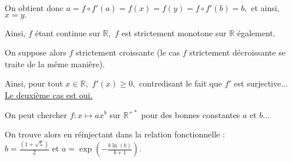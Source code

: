 On obtient donc $a=f\circ f'(a)=f(x)=f(y)=f\circ f'(b)=b,$ et ainsi, $x=y.$ 

Ainsi, $f$ étant continue sur $\mathbb{R},$ $f$ est strictement monotone sur $\mathbb{R}$ également.

On suppose alors $f$ strictement croissante (le cas $f$ strictement décroissante se traite de la même manière).

Ainsi, pour tout $x\in\mathbb{R},$ $\displaystyle f'(x)\geq 0,$ contredisant le fait que $f'$ est surjective...\\

\underline{ Le deuxième cas est oui.}

On peut chercher $f :x \mapsto ax^{b}$ sur $\mathbb{R}^{+*}$ pour des bonnes constantes $a$ et $b$... 

On trouve alors en réinjectant dans la relation fonctionnelle :  $\displaystyle b=\frac{(1+\sqrt{5})}{2} \mbox{ et } a=\exp(-\frac{b\ln(b)}{b+1}).$








